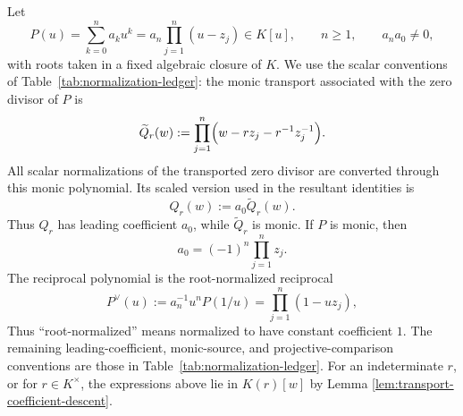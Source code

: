 \begin{definition}\label{def:reciprocal-transport-normalization}
Let
\[
P(u)=\sum_{k=0}^{n}a_k u^k=a_n\prod_{j=1}^{n}(u-z_j)\in K[u],
\qquad
n\ge 1,
\qquad
 a_n a_0\ne0,
\]
with roots taken in a fixed algebraic closure of \(K\).  We use the scalar conventions of Table~\ref{tab:normalization-ledger}: the monic transport associated with the zero divisor of \(P\) is
\[
\widetilde Q_r(w):=\prod_{j=1}^{n}\Bigl(w-r z_j-r^{-1}z_j^{-1}\Bigr).
\]
All scalar normalizations of the transported zero divisor are converted through this monic polynomial.  Its scaled version used in the resultant identities is
\[
Q_r(w):=a_0\widetilde Q_r(w).
\]
Thus \(Q_r\) has leading coefficient \(a_0\), while \(\widetilde Q_r\) is monic.  If \(P\) is monic, then
\[
a_0=(-1)^n\prod_{j=1}^n z_j.
\]
The reciprocal polynomial is the root-normalized reciprocal
\[
P^{\vee}(u):=a_n^{-1}u^nP(1/u)=\prod_{j=1}^{n}(1-u z_j),
\]
Thus ``root-normalized'' means normalized to have constant coefficient \(1\).  The remaining leading-coefficient, monic-source, and projective-comparison conventions are those in Table~\ref{tab:normalization-ledger}.  For an indeterminate \(r\), or for \(r\in K^\times\), the expressions above lie in \(K(r)[w]\) by Lemma \ref{lem:transport-coefficient-descent}.
\end{definition}

